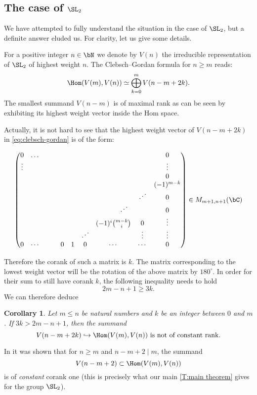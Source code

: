 \documentclass[reqno, 10pt]{amsart}
\theoremstyle{plain}
\newtheorem{corollary}[proposition]{Corollary}
\theoremstyle{definition}
\numberwithin{equation}{section}%
\begin{document}
\subsection{The case of $\SL_2$}
We have attempted to fully understand the situation in the case of $\SL_2$, but a definite answer eluded us. For clarity, let us give some details.

For a positive integer $n\in\bN$ we denote by $V(n)$ the irreducible representation of $\SL_2$ of highest weight $n$. 
The Clebsch--Gordan formula for $n\ge m$ reads:
\begin{equation}\label{eq:clebsch-gordan}
	\Hom(V(m),V(n)) \simeq \bigoplus_{k=0}^m V(n-m+2k).
\end{equation} 
The smallest summand $V(n-m)$ is of maximal rank as can be seen by exhibiting its highest weight vector inside the Hom space.

Actually, it is not hard to see that the highest weight vector of $V(n-m+2k)$ in
\eqref{eq:clebsch-gordan} is of the form:

  \[ \begin{pmatrix}
	0&\dots&&&&&&&&0\\
	\vdots&&&&&&&&&\vdots\\
	&&&&&&&&&0\\
	&&&&&&&&&(-1)^{m-k}\\
	&&&&&&&&\iddots&0\\
	&&&&&&&\qquad\quad\iddots&&0\\
	&&&&&&&(-1)^i{m-k\choose i}&0&\vdots\\
	&&&&&&\iddots&&\vdots&\vdots\\
	0&\cdots&&&0&1&0&\cdots&\cdots&0
\end{pmatrix} \in M_{m+1,n+1}(\bC)\]

Therefore the corank of such a
matrix is $k$. 
The matrix corresponding to the lowest weight vector will be the rotation of the above matrix by $180^\circ$.
In order for their sum to still have corank $k$, the following inequality needs to hold
\[ 2m-n+1\ge 3k.\]
We can therefore deduce
\begin{corollary}
	Let $m\le n$ be natural numbers and $k$ be an integer between $0$ and $m$.
	If $3k>2m-n+1$, then the summand
	\[ V(n-m+2k)\hookrightarrow\Hom(V(m),V(n)) \text{ is not of constant rank}.\]
\end{corollary}

In \cite{BFL2} it was shown that for $n\ge m$ and $n-m+2\mid m$, the summand
\begin{equation}\label{eq:sl_2 second summand}
	 V(n-m+2)\subset \Hom(V(m),V(n))
\end{equation}
is of \emph{constant} corank one (this is precisely what our main \cref{T:main theorem} gives for the group $\SL_2$).
\end{document}
